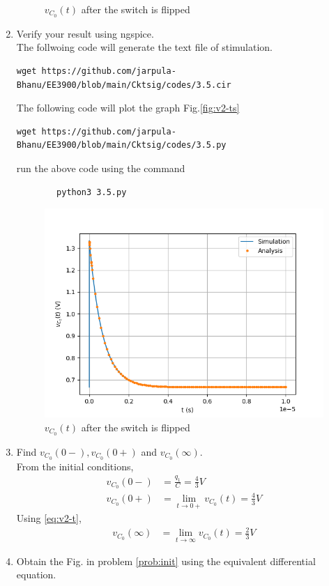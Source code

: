 \documentclass[journal,12pt,twocolumn]{IEEEtran}
\renewcommand\thesection{\arabic{section}}
\begin{document}
\begin{enumerate}[label=\arabic*.,ref=\thesection.\theenumi]
\begin{figure}[!ht]
        \caption{$v_{C_0}(t)$ after the switch is flipped}
        \label{fig:v2-t}
    \end{figure}
	\item Verify your result using ngspice.\\
	\solution  The follwoing code will generate the text file of stimulation.
    \begin{lstlisting}
wget https://github.com/jarpula-Bhanu/EE3900/blob/main/Cktsig/codes/3.5.cir
    \end{lstlisting}
    The following code will plot the graph Fig.\eqref{fig:v2-ts}
    \begin{lstlisting}
wget https://github.com/jarpula-Bhanu/EE3900/blob/main/Cktsig/codes/3.5.py
    \end{lstlisting}
        run the above code using the command
        \begin{lstlisting}
        python3 3.5.py
        \end{lstlisting}
    \begin{figure}[!ht]
        \includegraphics[width=\columnwidth]{./figs/3.5.png}
        \caption{$v_{C_0}(t)$ after the switch is flipped}
        \label{fig:v2-ts}
    \end{figure}
	\item Find $v_{C_0}(0-), v_{C_0}(0+)$ and  $v_{C_0}(\infty) $.\\
\solution From the initial conditions,
\begin{align}
    v_{C_0}(0-) &= \frac{q_1}{C} = \frac{4}{3}{V}\\
    v_{C_0}(0+) &= \lim_{t \rightarrow 0+}v_{C_0}(t) = \frac{4}{3}{V} 
\end{align}
Using \eqref{eq:v2-t},
\begin{align}
    v_{C_0}(\infty) &= \lim_{t \rightarrow \infty}v_{C_0}(t) = \frac{2}{3}{V}
\end{align}
	\item Obtain the Fig.  in problem 
		\ref{prob:init}
			using the equivalent differential equation.


\end{enumerate}
\end{document}
